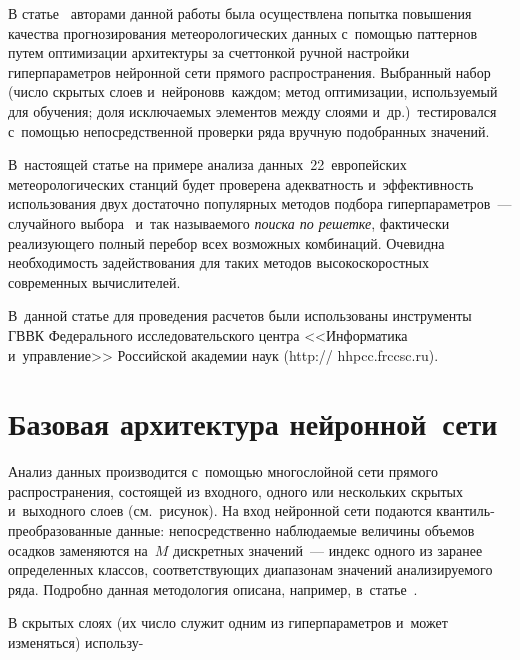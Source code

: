 \begin{multicols}{2}
В статье~\cite{Gorshenin2019} авторами данной работы была осуществлена попытка повышения 
качества прогнозирования метеорологических данных с~по\-мощью\linebreak
 паттернов путем 
оптимизации архитектуры за счет\linebreak тон\-кой ручной на\-строй\-ки гиперпараметров 
ней\-рон\-ной сети прямого распространения. Выбранный набор (чис\-ло скрытых 
слоев и~нейронов\linebreak в~каж\-дом; метод оптимизации, используемый для обуче\-ния; 
доля исключаемых элементов между слоями и~др.)\ тестировался с~по\-мощью 
непосредственной проверки ряда вручную подобранных значений. 

В~настоящей статье 
на примере анализа данных~22~европейских метеорологических станций будет 
проверена адекватность и~эффективность использования двух достаточно 
популярных методов подбора гиперпараметров~--- случайного выбора~\cite{Bergstra2012} 
и~так называемого \textit{поиска по решетке}, фактически реализующего 
полный перебор всех возможных комбинаций. Очевидна необходимость 
задействования для таких методов высокоскоростных современных вычислителей. 

В~данной статье для проведения расчетов были использованы инструменты 
ГВВК 
Федерального исследовательского центра <<Информатика и~управ\-ле\-ние>> 
Российской академии наук ({\sf http:// hhpcc.frccsc.ru}).

\vspace*{-6pt}

\section{Базовая архитектура нейронной~сети}
\label{Architecture}

\vspace*{-2pt}

Анализ данных производится с~помощью многослойной сети прямого 
распространения, состоящей из входного, одного или нескольких скрытых и~выходного 
слоев  (см.\ рисунок). На вход нейронной сети подаются 
кван\-тиль-пре\-об\-ра\-зо\-ван\-ные данные: непосредственно наблюдаемые величины 
объемов осадков заменяются на~$M$ дискретных значений~--- 
индекс одного из заранее определенных классов, соответствующих 
диапазонам значений анализируемого ряда. Подробно данная методология 
описана, например, в~статье~\cite{Gorshenin2018}.

В скрытых слоях (их число служит одним из гиперпараметров и~может изменяться) 
использу-\linebreak\vspace*{-12pt}


\end{multicols}
